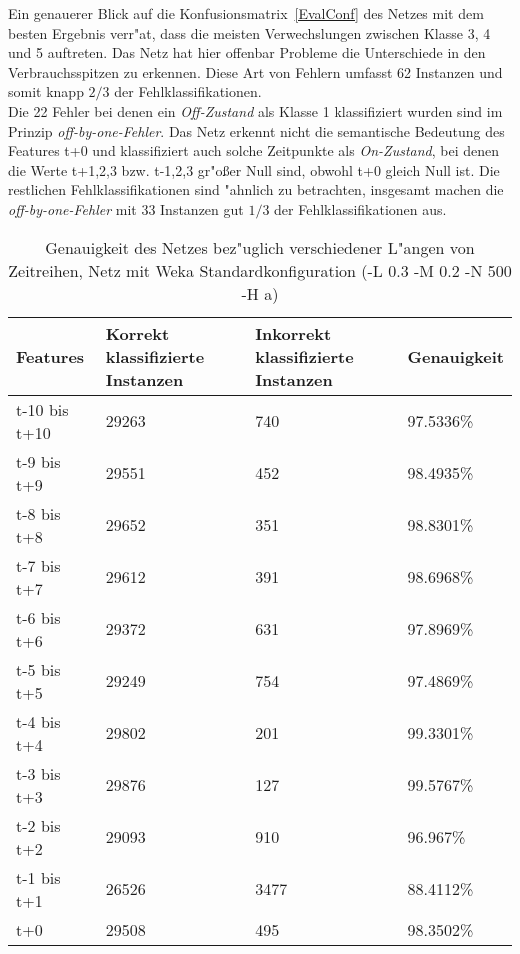 Ein genauerer Blick auf die Konfusionsmatrix~\ref{EvalConf} des Netzes mit dem besten Ergebnis verr"at, dass die meisten Verwechslungen zwischen Klasse 3, 4 und 5 auftreten. Das Netz hat hier offenbar Probleme die Unterschiede in den Verbrauchsspitzen zu erkennen. Diese Art von Fehlern umfasst 62 Instanzen und somit knapp $2/3$ der Fehlklassifikationen. \\
Die 22 Fehler bei denen ein \textit{Off-Zustand} als Klasse 1 klassifiziert wurden sind im Prinzip \textit{off-by-one-Fehler}. Das Netz erkennt nicht die semantische Bedeutung des Features t+0 und klassifiziert auch solche Zeitpunkte als \textit{On-Zustand}, bei denen die Werte t+1,2,3 bzw. t-1,2,3 gr"o{\ss}er Null sind, obwohl t+0 gleich Null ist. Die restlichen Fehlklassifikationen sind "ahnlich zu betrachten, insgesamt machen die \textit{off-by-one-Fehler} mit 33 Instanzen gut $1/3$ der Fehlklassifikationen aus. \\


\begin{table}[p]
\begin{tabular}{l|p{4cm}|p{4cm}|l}
Features & Korrekt klassifizierte Instanzen & Inkorrekt klassifizierte Instanzen & Genauigkeit  \\
\hline
t-10 bis t+10 & 29263 & 740 & 97.5336\% \\
t-9 bis t+9 & 29551 & 452 & 98.4935\% \\
t-8 bis t+8 & 29652 & 351 & 98.8301\% \\
t-7 bis t+7 & 29612 & 391 & 98.6968\% \\
t-6 bis t+6 & 29372 & 631 & 97.8969\% \\
t-5 bis t+5 & 29249 & 754 & 97.4869\% \\
t-4 bis t+4 & 29802 & 201 & 99.3301\% \\
t-3 bis t+3 & 29876 & 127 & 99.5767\% \\
t-2 bis t+2 & 29093 & 910 & 96.967\% \\
t-1 bis t+1 & 26526 & 3477 & 88.4112\% \\
t+0 & 29508 & 495 & 98.3502\% 
\end{tabular}
\caption[Genauigkeit der Zeitreihen Features]{Genauigkeit des Netzes bez"uglich verschiedener L"angen von Zeitreihen, Netz mit Weka Standardkonfiguration (-L 0.3 -M 0.2 -N 500 -H a)}
\label{EvalZeit}
\end{table}

